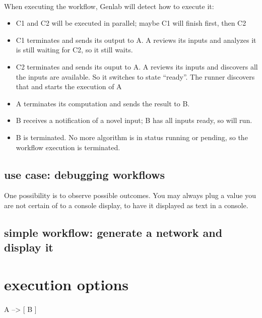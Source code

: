 \documentclass[a4paper,10pt]{book}
\begin{document}
\paragraph*{}
When executing the workflow, Genlab will detect how to execute it:
\begin{itemize}
\item C1 and C2 will be executed in parallel; maybe C1 will finish first, then C2
\item C1 terminates and sends its output to A. A reviews its inputs and analyzes it is still waiting for C2, so it still waits.
\item C2 terminates and sends its ouput to A. A reviews its inputs and discovers all the inputs are available. So it switches to state ``ready''. The runner discovers that and starts the execution of A
\item A terminates its computation and sends the result to B. 
\item B receives a notification of a novel input; B has all inputs ready, so will run.
\item B is terminated. No more algorithm is in status running or pending, so the workflow execution is terminated.
\end{itemize}

\subsection{use case: debugging workflows}

One possibility is to observe possible outcomes. You may always plug a value you are not certain of to a console display, to have it displayed as text in a console.

\subsection{simple workflow: generate a network and display it}

\section{execution options}

\paragraph*{}
A --> [ B ]
\end{document}
